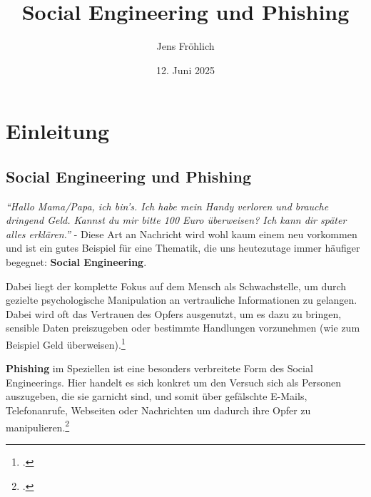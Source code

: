\documentclass[12pt, a4paper, oneside]{scrartcl}
\title{Social Engineering und Phishing}
\author{Jens Fröhlich}
\date{12. Juni 2025}
\begin{document}

\begin{titlepage}
    \thispagestyle{empty}
    \maketitle
    \vspace{2cm}
    \begin{center}
    \end{center}
\end{titlepage}


\clearpage
\pagestyle{empty}
\tableofcontents


\justify


\pagestyle{scrheadings}
\clearpairofpagestyles

\ihead{}
\chead{}
\ohead{}

\ifoot{}
\cfoot[\pagemark]{\pagemark}
\ofoot{}

\setcounter{page}{2}

\section{Einleitung}

\subsection{Social Engineering und Phishing}
\textit{``Hallo Mama/Papa, ich bin's. Ich habe mein Handy verloren und 
brauche dringend Geld. Kannst du mir bitte 100 Euro überweisen? 
Ich kann dir später alles erklären.''} - Diese Art an Nachricht wird wohl kaum einem
neu vorkommen und ist ein gutes Beispiel für eine Thematik, die uns heutezutage immer häufiger begegnet:
\textbf{Social Engineering}.
\par
Dabei liegt der komplette Fokus auf dem Mensch als Schwachstelle, um durch gezielte psychologische
Manipulation an vertrauliche Informationen zu gelangen. Dabei wird oft das Vertrauen des Opfers ausgenutzt, 
um es dazu zu bringen, sensible Daten preiszugeben oder bestimmte Handlungen vorzunehmen (wie zum Beispiel
Geld überweisen).\footcite{BSISocialEngineering}
\par
\textbf{Phishing} im Speziellen ist eine besonders verbreitete Form des Social Engineerings. 
Hier handelt es sich konkret um den Versuch sich als Personen auszugeben, die sie garnicht sind,
und somit über gefälschte E-Mails, Telefonanrufe, Webseiten oder Nachrichten um dadurch ihre Opfer zu 
manipulieren.\footcite{BSIPhishing}\\
\end{document}
